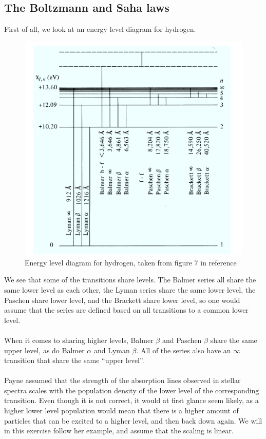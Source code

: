 \documentclass{article}
\begin{document}
\subsection{The Boltzmann and Saha laws}
First of all, we look at an energy level diagram for hydrogen.
\begin{figure}[H]
  \centering
  \includegraphics[scale=0.6]{figure7.png}
  \caption{Energy level diagram for hydrogen, taken from figure 7 in reference\cite{cite:ssa}}
  \label{fig:7}
\end{figure}
We see that some of the transitions share levels. The Balmer series all share the same lower level as each other, the Lyman series share the same lower level, the Paschen share lower level, and the Brackett share lower level, so one would assume that the series are defined based on all transitions to a common lower level.\\\\
When it comes to sharing higher levels, Balmer $\beta$ and Paschen $\beta$ share the same upper level, as do Balmer $\alpha$ and Lyman $\beta$. All of the series also have an $\infty$ transition that share the same ``upper level''.\\\\
Payne assumed that the strength of the absorption lines observed in stellar spectra scales with the population density of the lower level of the corresponding transition. Even though it is not correct, it would at first glance seem likely, as a higher lower level population would mean that there is a higher amount of particles that can be excited to a higher level, and then back down again. We will in this exercise follow her example, and assume that the scaling is linear.\\\\
\end{document}
